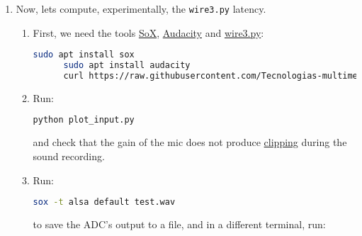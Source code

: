 \begin{enumerate}
  \begin{lstlisting}[language=Bash]
    python wire3.py
  \end{lstlisting}
  
  althought probably you will obtain the error:
  
  \begin{lstlisting}[language=Bash]
    nose
  \end{lstlisting}

  This is solved by intalling the
  \href{https://python-sounddevice.readthedocs.io/en/latest/}{python-sounddevice}
  \cite{sounddevice} module with:

  \begin{lstlisting}[language=Bash]
    pip install sounddevice
  \end{lstlisting}

\item Now, lets compute, experimentally, the \texttt{wire3.py}
  latency.

  \begin{enumerate} \item First, we need the
  tools \href{http://sox.sourceforge.net/}{SoX}, \href{https://www.audacityteam.org/}{Audacity}
  and \href{https://raw.githubusercontent.com/Tecnologias-multimedia/intercom/master/test/sounddevice/wire3.py}{wire3.py}:
  
    \begin{lstlisting}[language=Bash]
      sudo apt install sox
      sudo apt install audacity
      curl https://raw.githubusercontent.com/Tecnologias-multimedia/intercom/master/test/sounddevice/plot_input.py > plot_input.py
    \end{lstlisting}

  \item Run:

    \begin{lstlisting}[language=Bash]
      python plot_input.py
    \end{lstlisting}

    and check that the gain of the mic does not
    produce \href{https://en.wikipedia.org/wiki/Clipping_(audio)}{clipping}
    during the sound recording.

  \item Run:

    \begin{lstlisting}[language=Bash]
      sox -t alsa default test.wav
    \end{lstlisting}

    to save the ADC's output to a file, and in a different terminal,
    run:


\end{enumerate}
\end{enumerate}
